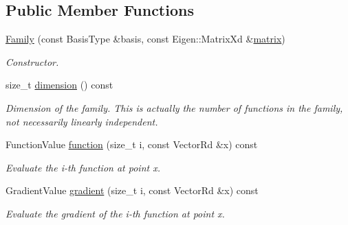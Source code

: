\subsection*{Public Member Functions}
\begin{DoxyCompactItemize}
\item 
\hyperlink{classHArDCore3D_1_1Family_aa0576f3bfd8f5cdbdd863f147b646d15}{Family} (const Basis\+Type \&basis, const Eigen\+::\+Matrix\+Xd \&\hyperlink{classHArDCore3D_1_1Family_af056ff8a6cbf5c566c243290e72af217}{matrix})
\begin{DoxyCompactList}\small\item\em Constructor. \end{DoxyCompactList}\item 
\mbox{\label{classHArDCore3D_1_1Family_aa71fa9b9c83346561fde4c764a1b2e72}} 
size\+\_\+t \hyperlink{classHArDCore3D_1_1Family_aa71fa9b9c83346561fde4c764a1b2e72}{dimension} () const
\begin{DoxyCompactList}\small\item\em Dimension of the family. This is actually the number of functions in the family, not necessarily linearly independent. \end{DoxyCompactList}\item 
\mbox{\label{classHArDCore3D_1_1Family_a3616bf77a028e9e7638af28820370931}} 
Function\+Value \hyperlink{classHArDCore3D_1_1Family_a3616bf77a028e9e7638af28820370931}{function} (size\+\_\+t i, const Vector\+Rd \&x) const
\begin{DoxyCompactList}\small\item\em Evaluate the i-\/th function at point x. \end{DoxyCompactList}\item 
\mbox{\label{classHArDCore3D_1_1Family_a7e8e2733993bda1d5aff348d7d31cbcf}} 
Gradient\+Value \hyperlink{classHArDCore3D_1_1Family_a7e8e2733993bda1d5aff348d7d31cbcf}{gradient} (size\+\_\+t i, const Vector\+Rd \&x) const
\begin{DoxyCompactList}\small\item\em Evaluate the gradient of the i-\/th function at point x. \end{DoxyCompactList}\item 
\mbox{\label{classHArDCore3D_1_1Family_af5aac63dc865a440eb25c6b41b8d66d1}} 

\end{DoxyCompactItemize}
